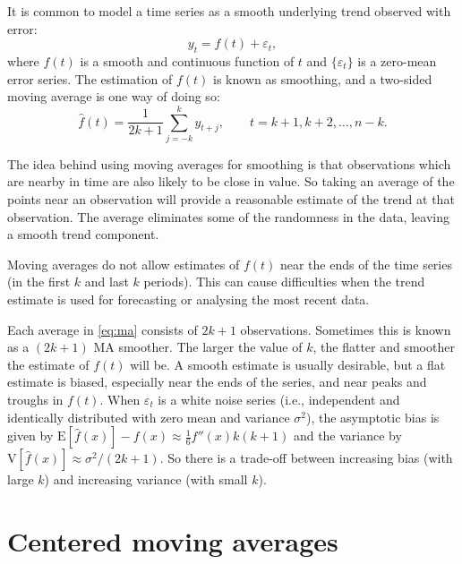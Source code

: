 \documentclass[a4paper,10pt]{article}
\newcommand{\E}{\text{E}}
\newcommand{\var}{\text{V}}
\begin{document}
It is common to model a time series as a smooth underlying trend observed with error:
\[
	y_t = f(t) + \varepsilon_t,
\]
where $f(t)$ is a smooth and continuous function of $t$ and $\{\varepsilon_t\}$ is a zero-mean error series. The estimation of $f(t)$ is known as smoothing, and a two-sided moving average is one way of doing so:
\begin{equation}\label{eq:ma}
	\hat{f}(t) = \frac{1}{2k+1}\sum_{j=-k}^{k} y_{t+j}, \qquad t=k+1,k+2,\dots,n-k.
\end{equation}

The idea behind using moving averages for smoothing is that observations which are nearby in time are also likely to be close in value. So taking an average of the points near an observation will provide a reasonable estimate of the trend at that observation. The average eliminates some of the randomness in the data, leaving a smooth trend component.

Moving averages do not allow estimates of $f(t)$ near the ends of the time series (in the first $k$ and last $k$ periods). This can cause difficulties when the trend estimate is used for forecasting or analysing the most recent data.

Each average in \eqref{eq:ma} consists of $2k+1$ observations. Sometimes this is known as a $(2k+1)$ MA smoother. The larger the value of $k$, the flatter and smoother the estimate of $f(t)$ will be. A smooth estimate is usually desirable, but a flat estimate is biased, especially near the ends of the series, and near peaks and troughs in $f(t)$. When $\varepsilon_t$ is a white noise series (i.e., independent and identically distributed with zero mean and variance $\sigma^2$), the asymptotic bias is given by $\E[\hat{f}(x)]-f(x) \approx \frac16 f''(x) k(k+1)$ and the variance by $\var[\hat{f}(x)] \approx \sigma^2/(2k+1)$. So there is a trade-off between increasing bias (with large $k$) and increasing variance (with small $k$).

\section{Centered moving averages}
\end{document}
